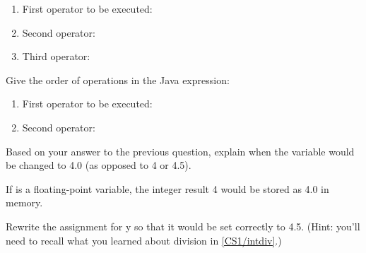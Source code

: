 \begin{enumerate}
\item First operator to be executed: \ans{\java{-}}
\item Second operator: \ans{\java{*}}
\item Third operator: \ans{\java{=}}
\end{enumerate}


\Q Give the order of operations in the Java expression: ~ 

\begin{enumerate}
\item First operator to be executed: \ans{\java{/}}
\item Second operator: \ans{\java{=}}
\end{enumerate}


\Q Based on your answer to the previous question, explain when the variable  would be changed to 4.0 (as opposed to 4 or 4.5).

\begin{answer}
If  is a floating-point variable, the integer result 4 would be stored as 4.0 in memory.
\end{answer}


\Q Rewrite the assignment for y so that it would be set correctly to 4.5. (Hint: you'll need to recall what you learned about division in \ref{CS1/intdiv}.)

\begin{answer}
\end{answer}
